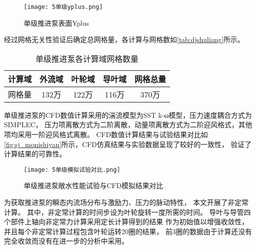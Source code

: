 \begin{figure}[htbp]
    \centering
    \texttt{[image: 5单级yplus.png]}
    \caption{\label{fig:djyplus}单级推进泵表面Yplus}
\end{figure}

经过网格无关性验证后确定总网格量，各计算与网格数如\autoref{tab:djshuliang}所示。
\begin{table}[htbp]
    \centering
    \caption{\label{tab:djshuliang}单级推进泵各计算域网格数量}
    \begin{tabular}{ccccc}
        \toprule
        计算域 & 外流域 & 叶轮域 & 导叶域  & 网格总量 \\
        \midrule
        网格量 & 132万 & 122万 & 116万 & 370万 \\
        \bottomrule
    \end{tabular}
\end{table}

单级推进泵的CFD数值计算采用的湍流模型为SST k-ω模型，压力速度耦合方式为SIMPLEC，
压力项离散方式为二阶离散，动量项离散方式为二阶迎风格式，其他项均采用一阶迎风格式离散。
CFD数值计算结果与试验结果对比如\autoref{fig:sj_monishiyan}所示，CFD仿真结果与实验数据呈现了较好的一致性，
验证了计算结果的可靠性。
\begin{figure}[htbp]
    \centering
    \texttt{[image: 5单级模拟试验对比.png]}
    \caption{\label{fig:sj_monishiyan}单级推进泵敞水性能试验与CFD模拟结果对比}
\end{figure}

为获取推进泵的瞬态内流场分布与激励力、压力的脉动特性，
本文开展了非定常计算。
其中，非定常计算的时间步设为叶轮旋转一度所需的时间。
导叶与导管四个部件上轴向非定常力计算采用定长计算得到的结果
作为初始值以增强收敛性，并且每个非定常计算过程包含叶轮运转20圈的结果，
前3圈的数据由于计算还没有完全收敛而没有在进一步的分析中采用。
